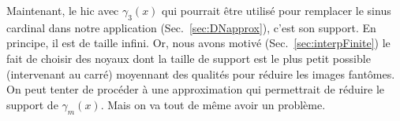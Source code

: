 \documentclass[11pt,twoside]{article}
\begin{document}
Maintenant, le hic avec $\gamma_3(x)$ qui pourrait être utilisé pour remplacer le sinus cardinal dans notre application (Sec.~\ref{sec:DNapprox}), c'est son support. En principe, il est de taille infini. 
Or, nous avons motivé (Sec.~\ref{sec:interpFinite}) le fait de choisir des noyaux dont la taille de support est le plus petit possible (intervenant au carré) moyennant des qualités pour réduire les images fantômes.  On peut tenter de procéder à une approximation qui permettrait de réduire le support de $\gamma_m(x)$. Mais on va tout de même avoir un problème.
\end{document}
